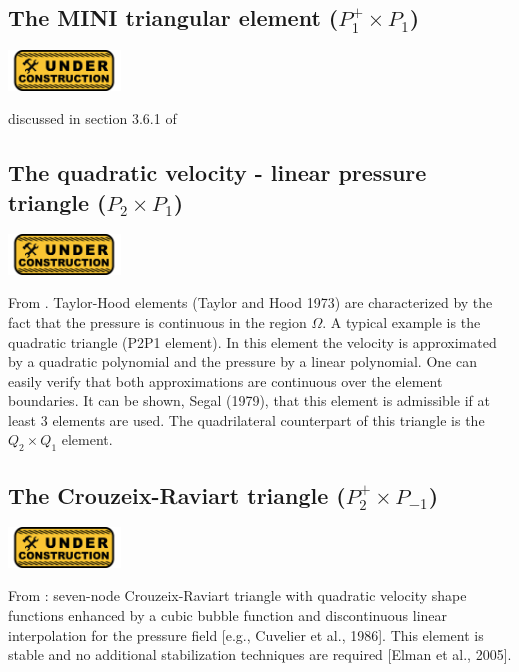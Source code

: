 \subsection{The MINI triangular element ($P_1^+\times P_1$)}
\includegraphics[width=3cm]{images/under_construction}

discussed in section 3.6.1 of \cite{john16}

\subsection{The quadratic velocity - linear pressure triangle ($P_2\times P_1$)}
\includegraphics[width=3cm]{images/under_construction}

From \cite{segal}.
Taylor-Hood elements (Taylor and Hood 1973) 
are characterized by the fact that the pressure is continuous in the region $\Omega$. 
A typical example is the quadratic triangle (P2P1 element).
In this element the velocity is approximated by a quadratic polynomial and the pressure by a
linear polynomial. One can easily verify that both approximations are continuous over 
the element boundaries. 
It can be shown, Segal (1979), that this element is admissible if at least 3 elements 
are used. The quadrilateral counterpart of this triangle is the $Q_2\times Q_1$ element.




\subsection{The Crouzeix-Raviart triangle ($P_2^+\times P_{-1}$)}
\includegraphics[width=3cm]{images/under_construction}

From \cite{daks08}: seven-node Crouzeix-Raviart triangle with quadratic velocity shape functions enhanced by a cubic bubble function and discontinuous linear interpolation for the pressure field [e.g., Cuvelier et al., 1986]. This element is stable and no additional stabilization techniques are required [Elman et al., 2005].

